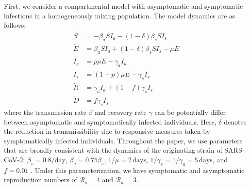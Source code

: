 \documentclass[12pt]{article}
\newcommand{\RR}{\ensuremath{{\mathcal R}}\xspace}
\begin{document}
First, we consider a compartmental model with asymptomatic and symptomatic infections in a homogeneously mixing population.
The model dynamics are as follows:
\begin{align}
\dot{S} &= -\beta_a S I_a -(1-\delta) \beta_s S I_s \\
\dot{E} &= \beta_a S I_a + (1-\delta) \beta_s S I_s - \mu E\\
\dot{I}_a &= p \mu E - \gamma_a I_a\\
\dot{I}_s &= (1-p) \mu E -\gamma_s I_s\\
\dot{R} &= \gamma_a I_a + (1-f) \gamma_s I_s \\
\dot{D} &= f \gamma_s I_s
\end{align}
where the transmission rate $\beta$ and recovery rate $\gamma$ can be potentially differ between asymptomatic and symptomatically infected individuals.  
Here, $\delta$ denotes the reduction in transmissibility due to responsive measures taken by symptomatically infected individuals.
Throughout the paper, we use parameters that are broadly consistent with the dynamics of the originating strain of SARS-CoV-2: $\beta_s = 0.8/\mathrm{day}$, $\beta_a = 0.75 \beta_s$, $1/\mu=2\,\mathrm{days}$, $1/\gamma_s=1/\gamma_a=5\,\mathrm{days}$, and $f=0.01$ \citep{park2020reconciling}.
Under this parameterization, we have symptomatic and asymptomatic reproduction numbers of $\RR_s = 4$ and $\RR_a = 3$.
\end{document}
